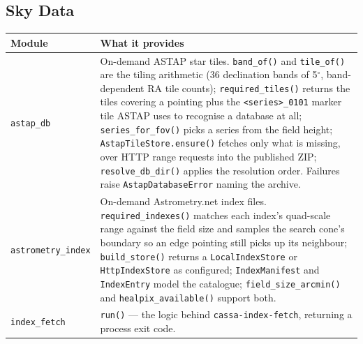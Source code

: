 \documentclass[11pt,a4paper]{article}
\begin{document}
\subsection{Sky Data}
\begin{center}
\begin{longtable}{|p{3.6cm}|p{10.9cm}|}
\hline
\textbf{Module} & \textbf{What it provides} \\
\hline
\endhead
\texttt{astap\_db} & On-demand ASTAP star tiles. \texttt{band\_of()} and \texttt{tile\_of()} are the tiling arithmetic (36 declination bands of 5$^\circ$, band-dependent RA tile counts); \texttt{required\_tiles()} returns the tiles covering a pointing plus the \texttt{<series>\_0101} marker tile ASTAP uses to recognise a database at all; \texttt{series\_for\_fov()} picks a series from the field height; \texttt{AstapTileStore.ensure()} fetches only what is missing, over HTTP range requests into the published ZIP; \texttt{resolve\_db\_dir()} applies the resolution order. Failures raise \texttt{AstapDatabaseError} naming the archive. \\
\hline
\texttt{astrometry\_index} & On-demand Astrometry.net index files. \texttt{required\_indexes()} matches each index's quad-scale range against the field size and samples the search cone's boundary so an edge pointing still picks up its neighbour; \texttt{build\_store()} returns a \texttt{LocalIndexStore} or \texttt{HttpIndexStore} as configured; \texttt{IndexManifest} and \texttt{IndexEntry} model the catalogue; \texttt{field\_size\_arcmin()} and \texttt{healpix\_available()} support both. \\
\hline
\texttt{index\_fetch} & \texttt{run()} --- the logic behind \texttt{cassa-index-fetch}, returning a process exit code. \\
\hline
\end{longtable}
\end{center}
\end{document}
